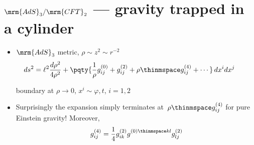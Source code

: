 \documentclass[10pt]{article}
\renewenvironment{frame}[1]%
	{\section*{#1}}%
	{\clearpage}
\newcommand{\pause}{}
\newenvironment{columns}%
	{\par\begin{minipage}{\textwidth}}%
	{\end{minipage}}
\newenvironment{column}[1]%
	{\begin{minipage}{#1}}%
	{\end{minipage}}
\begin{document}
\begin{frame}{$\mrm{AdS}_3/\mrm{CFT}_2$ --- gravity trapped in a cylinder}

\textcite{Aharony:1999ti}

\begin{columns}
\figAdsCft
\begin{column}{.72\textwidth}
	\begin{itemize}
	\item $\mrm{AdS}_3$ metric, $\rho \sim z^2 \sim r^{-2}$
	\begin{equation}
	\hspace{-2em}
		ds^2 = \ell^2 \frac{d\rho^2}{4 \rho^2} + \pqty{\frac{1}{\rho} g^{(0)}_{ij} + g^{(2)}_{ij} + \rho\thinmspace g^{(4)}_{ij} + \cdots}\, dx^i dx^j \label{fggauge}
	\end{equation}
	
	\vspace{-.5\baselineskip}
	boundary at $\rho \to 0$, $x^{i} \sim \varphi, t$, $i = 1,2$

\pause
	\item Surprisingly the expansion simply terminates at~$\rho\thinmspace g^{(4)}_{ij}$ for pure Einstein gravity! Moreover,
	\begin{equation}
		g^{(4)}_{ij} = \frac{1}{4} g^{(2)}_{ik} g^{(0)\thinmspace kl}_{\phantom{kl}} g^{(2)}_{lj}
	\end{equation}
	\textcite{Fefferman:2007rka,Banados:1998gg}
	\end{itemize}
\end{column}
\end{columns}
\end{frame}

\newcommand{\eqBanados}{
	\begin{equation*}
	\hspace{-2em}
		ds^2 = \ell^2 \bigg( \frac{d\rho^2}{4 \rho^2} + \frac{ \big( du + \rho \, \mathcal {\bar L}(v)\, dv \big) \big( dv + \rho \, \mathcal L(u)\, du \big) }{\rho} \bigg)\ \,
	\end{equation*}
}
\end{document}
